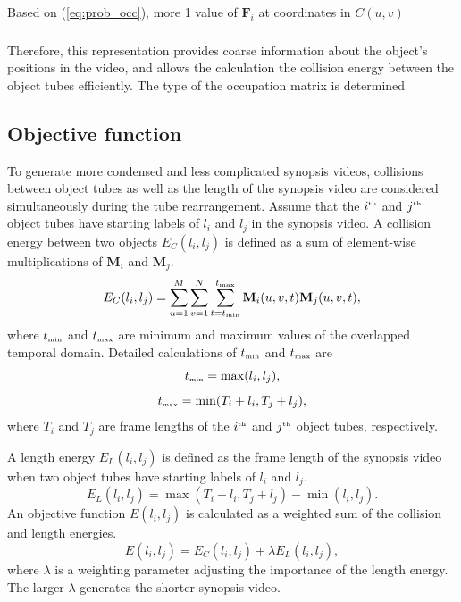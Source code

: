\documentclass[11pt]{hyu_thesis}
\begin{document}
Based on (\ref{eq:prob_occ}), more 1 value of $\textbf{F}_i$ at coordinates in $C(u,v)$

\subsubsection{}
 Therefore, this representation provides coarse information about the object's positions in the video, and allows the calculation the collision energy between the object tubes efficiently. The type of the occupation matrix is determined 

\subsection{Objective function}
To generate more condensed and less complicated synopsis videos, collisions between object tubes as well as the length of the synopsis video are considered simultaneously during the tube rearrangement. Assume that the $i^\textrm{\tiny{th}}$ and $j^\textrm{\tiny{th}}$ object tubes have starting labels of $l_i$ and $l_j$ in the synopsis video. A collision energy between two objects $E_C (l_i,l_j)$ is defined as a sum of element-wise multiplications of $\textbf{M}_i$ and $\textbf{M}_j$.
\begin{equation}
\label{eq:collision_cost}
E_C(l_i,l_j) = \sum_{u=1}^{M}\sum_{v=1}^{N}\sum_{t=t_\textrm{\tiny{min}}}^{t_\textrm{\tiny{max}}} \textbf{M}_i(u,v,t)\textbf{M}_j(u,v,t),
\end{equation}
where $t_\textrm{\tiny{min}}$ and $t_\textrm{\tiny{max}}$ are minimum and maximum values of the overlapped temporal domain. Detailed calculations of $t_\textrm{\tiny{min}}$ and $t_\textrm{\tiny{max}}$ are
\begin{equation}
\label{eq:t_min}
t_\textrm{\tiny{min}} = \max(l_i, l_j),
\end{equation}
\begin{equation}
\label{eq:t_max}
t_\textrm{\tiny{max}} = \min(T_i + l_i, T_j + l_j),
\end{equation}
where $T_i$ and $T_j$ are frame lengths of the $i^\textrm{\tiny{th}}$ and $j^\textrm{\tiny{th}}$ object tubes, respectively.

A length energy $E_L (l_i,l_j)$ is defined as the frame length of the synopsis video when two object tubes have starting labels of $l_i$ and $l_j$.
\begin{equation}
\label{eq:length_cost}
E_L(l_i, l_j) = \max(T_i + l_i, T_j + l_j) - \min(l_i, l_j).
\end{equation}
An objective function $E(l_i,l_j)$ is calculated as a weighted sum of the collision and length energies.
\begin{equation}
\label{eq:obj_func}
E(l_i, l_j) = E_C(l_i, l_j) + \lambda E_L(l_i, l_j),
\end{equation}
where $\lambda$ is a weighting parameter adjusting the importance of the length energy. The larger $\lambda$ generates the shorter synopsis video.
\end{document}
